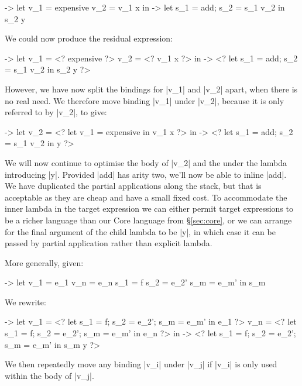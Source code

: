 \documentclass[draft]{sigplanconf}
\begin{document}
\begin{code}
\x ->  let  v_1 =  expensive
            v_2 =  v_1 x
       in   \y ->  let s_1 = add; s_2 = s_1 v_2 in s_2 y
\end{code}

We could now produce the residual expression:

\begin{code}
\x ->  let  v_1 =  <? expensive ?>
            v_2 =  <? v_1 x ?>
       in   \y ->  <? let s_1 = add; s_2 = s_1 v_2 in s_2 y ?>
\end{code}

However, we have now split the bindings for |v_1| and |v_2| apart, when there is no real need. We therefore move binding |v_1| under |v_2|, because it is only referred to by |v_2|, to give:

\begin{code}
\x ->  let  v_2 =  <? let v_1 = expensive in v_1 x ?>
       in   \y ->  <? let s_1 = add; s_2 = s_1 v_2 in y ?>
\end{code}

We will now continue to optimise the body of |v_2| and the under the lambda introducing |y|. Provided |add| has arity two, we'll now be able to inline |add|. We have duplicated the partial applications along the stack, but that is acceptable as they are cheap and have a small fixed cost. To accommodate the inner lambda in the target expression we can either permit target expressions to be a richer language than our Core language from \S\ref{sec:core}, or we can arrange for the final argument of the child lambda to be |y|, in which case it can be passed by partial application rather than explicit lambda.

More generally, given:

\begin{code}
\free ->  let  v_1  = e_1
               v_n  = e_n
               s_1  = f
               s_2  = e_2'
               s_m  = e_m'
          in   s_m
\end{code}

We rewrite:

\begin{code}
\free ->  let  v_1 =  <? let s_1 = f; s_2 = e_2'; s_m = e_m' in e_1 ?>
               v_n =  <? let s_1 = f; s_2 = e_2'; s_m = e_m' in e_n ?>
          in   \y ->  <? let s_1 = f; s_2 = e_2'; s_m = e_m' in s_m y ?>
\end{code}

We then repeatedly move any binding |v_i| under |v_j| if |v_i| is only used within the body of |v_j|.
\end{document}
